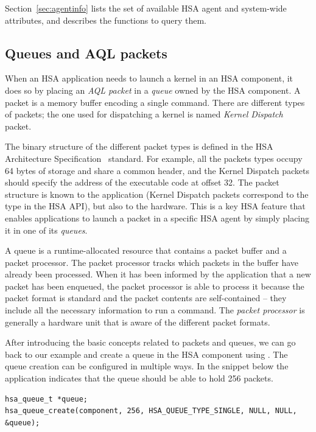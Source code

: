\documentclass[final,oneside]{book}
\begin{document}
Section~\ref{sec:agentinfo} lists the set of available HSA agent and
system-wide attributes, and describes the functions to query them.

\subsection{Queues and AQL packets}
When an HSA application needs to launch a kernel in an HSA component, it does so
by placing an \textit{AQL packet} in a \textit{queue} owned by the HSA
component. A packet is a memory buffer encoding a single command. There are
different types of packets; the one used for dispatching a kernel is named
\emph{Kernel Dispatch} packet.

The binary structure of the different packet types is defined in the HSA
Architecture Specification~\cite{sar} standard. For example, all the packets
types occupy 64 bytes of storage and share a common header, and the Kernel
Dispatch packets should specify the address of the executable code at offset
32. The packet structure is known to the application (Kernel Dispatch packets
correspond to the  type in the HSA API),
but also to the hardware. This is a key HSA feature that enables applications to
launch a packet in a specific HSA agent by simply placing it in one of its
\textit{queues}.

A queue is a runtime-allocated resource that contains a packet buffer and a
packet processor. The packet processor tracks which packets in the buffer have
already been processed. When it has been informed by the application that a new
packet has been enqueued, the packet processor is able to process it because the
packet format is standard and the packet contents are self-contained -- they
include all the necessary information to run a command. The \textit{packet
  processor} is generally a hardware unit that is aware of the different packet
formats.

After introducing the basic concepts related to packets and queues, we can go
back to our example and create a queue in the HSA component using
. The queue creation can be configured in multiple
ways. In the snippet below the application indicates that the queue should
be able to hold 256 packets.
\begin{lstlisting}
hsa_queue_t *queue;
hsa_queue_create(component, 256, HSA_QUEUE_TYPE_SINGLE, NULL, NULL, &queue);
\end{lstlisting}
\end{document}
